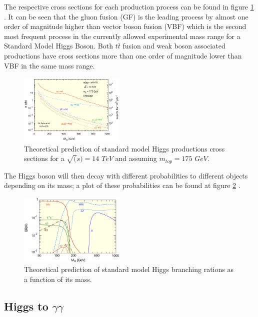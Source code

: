 \documentclass[%
reprint,
amsmath,
amssymb,
aps,
pra,
showkeys
]{revtex4-1}
\begin{document}
The respective cross sections for each production process can be found in figure \ref{figure_SMHiggs_XSec}
\cite{Takahashi:1019873}. It can be seen that the gluon fusion (GF) is the leading process by almost one order of
magnitude higher than vector boson fusion (VBF) which is the second most frequent process in the currently allowed 
experimental mass range for a Standard Model Higgs Boson. Both $t\bar{t}$ fusion and weak boson associated productions 
have cross sections more than one order of magnitude lower than VBF in the same mass range.

\begin{figure}[ht]
\centering
\includegraphics[width=0.45\textwidth]{img/SMHiggs_XSec.png}
\caption{Theoretical prediction of standard model Higgs productions cross sections for a $\sqrt(s)=14$ $TeV$
and assuming $m_{top}=175$ $GeV$.}
\label{figure_SMHiggs_XSec}
\end{figure}

The Higgs boson will then decay with different probabilities to different objects depending on its mass; a plot
of these probabilities can be found at figure \ref{figure_SMHiggs_BR} \cite{Takahashi:1019873}.

\begin{figure}[ht]
\centering
\includegraphics[width=0.45\textwidth]{img/SMHiggs_BR.png}
\caption{Theoretical prediction of standard model Higgs branching rations as a function of its mass.}
\label{figure_SMHiggs_BR}
\end{figure}

\subsection{Higgs to \texorpdfstring{$\gamma\gamma$}{gamma-gamma}}
\end{document}
